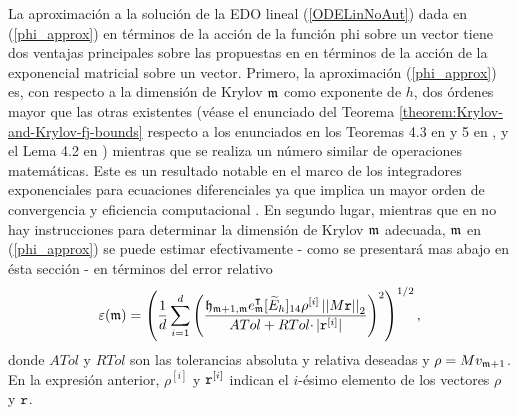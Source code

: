 La aproximación a la solución de la EDO lineal (\ref{ODELinNoAut}) dada en (\ref{phi_approx}) en términos de la acción de la función phi sobre un vector tiene dos ventajas principales sobre las propuestas en \cite{hochbruck1997krylov,sidje1998expokit,jimenez2012convergence}
en términos de la acción de la exponencial matricial sobre un vector. Primero, la aproximación (\ref{phi_approx}) es, con respecto a la dimensión de Krylov $\mathfrak{m}$ como exponente de $h$, dos órdenes mayor que las otras existentes (véase el enunciado del Teorema \ref{theorem:Krylov-and-Krylov-fj-bounds} respecto a los enunciados en los Teoremas 4.3 en \cite{Saad92} y 5 en \cite{hochbruck1997krylov}, y el Lema 4.2 en \cite{jimenez2012convergence}) mientras que se realiza un número similar de operaciones matemáticas. Este es un resultado notable en el marco de los integradores exponenciales para ecuaciones diferenciales ya que implica un mayor orden de convergencia y eficiencia computacional \cite{naranjo2021locally}. En segundo lugar, mientras que en \cite{hochbruck1997krylov,sidje1998expokit,jimenez2012convergence} no hay instrucciones para determinar la dimensión de Krylov $\mathfrak{m}$ adecuada, $\mathfrak{m}$ en (\ref{phi_approx}) se puede estimar efectivamente - como se presentará mas abajo en ésta sección - en términos del error relativo \cite{naranjo2021locally,naranjo2023computing}
\begin{equation}
\varepsilon(\mathfrak{m}) = \left(\frac{1}{d}\sum\limits_{i=1}^{d} \left(\frac{
	\mathfrak{h}_{\mathfrak{m}+1,\mathfrak{m}} e_{\mathfrak{m}}^\intercal
	[\widetilde{E}_h]_{14} \rho^{[i]} \left\lvert \left\lvert M\mathtt{r} \right\rvert \right\rvert_2}{ATol+ RTol\cdotp
	\rvert \mathtt{r}^{[i]}\rvert}\right)^{2}\right)^{1/2}, \label{eq:def-rel-error}
\end{equation}
donde $ATol$ y $RTol$ son las tolerancias absoluta y relativa deseadas y $\rho = M v_{\mathfrak{m}+1}$. En la expresión anterior, $\rho^{[i]}$ y $\mathtt{r}^{[i]}$ indican el $i$-ésimo elemento de los vectores $\rho$ y $\mathtt{r}$.


